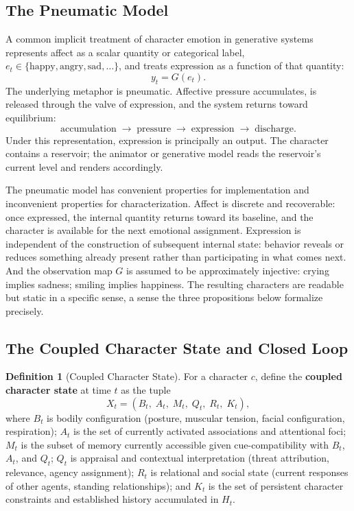 \documentclass[11pt,a4paper]{article}
\theoremstyle{plain}
\theoremstyle{definition}
\newtheorem{definition}[theorem]{Definition}
\theoremstyle{remark}
\begin{document}
\subsection{The Pneumatic Model}

A common implicit treatment of character emotion in generative systems represents affect as a scalar quantity or categorical label, $e_t \in \{\text{happy},\allowbreak \text{angry},\allowbreak \text{sad},\allowbreak \ldots\}$, and treats expression as a function of that quantity:
\[
y_t = G(e_t).
\]
The underlying metaphor is pneumatic. Affective pressure accumulates, is released through the valve of expression, and the system returns toward equilibrium:
\[
\text{accumulation} \;\to\; \text{pressure} \;\to\; \text{expression} \;\to\; \text{discharge}.
\]
Under this representation, expression is principally an output. The character contains a reservoir; the animator or generative model reads the reservoir's current level and renders accordingly.

The pneumatic model has convenient properties for implementation and inconvenient properties for characterization. Affect is discrete and recoverable: once expressed, the internal quantity returns toward its baseline, and the character is available for the next emotional assignment. Expression is independent of the construction of subsequent internal state: behavior reveals or reduces something already present rather than participating in what comes next. And the observation map $G$ is assumed to be approximately injective: crying implies sadness; smiling implies happiness. The resulting characters are readable but static in a specific sense, a sense the three propositions below formalize precisely.

\subsection{The Coupled Character State and Closed Loop}

\begin{definition}[Coupled Character State]
For a character $c$, define the \textbf{coupled character state} at time $t$ as the tuple
\[
X_t = (B_t,\; A_t,\; M_t,\; Q_t,\; R_t,\; K_t),
\]
where $B_t$ is bodily configuration (posture, muscular tension, facial configuration, respiration); $A_t$ is the set of currently activated associations and attentional foci; $M_t$ is the subset of memory currently accessible given cue-compatibility with $B_t$, $A_t$, and $Q_t$; $Q_t$ is appraisal and contextual interpretation (threat attribution, relevance, agency assignment); $R_t$ is relational and social state (current responses of other agents, standing relationships); and $K_t$ is the set of persistent character constraints and established history accumulated in $H_t$.
\end{definition}
\end{document}
